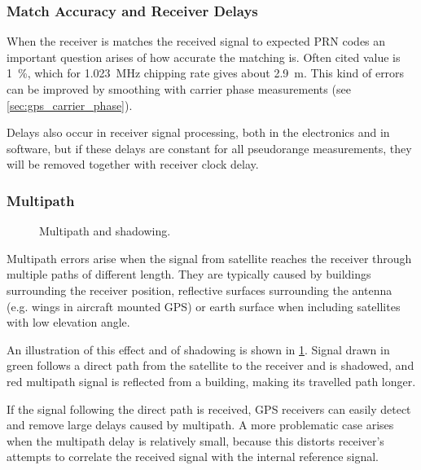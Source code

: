 
\subsubsection{Match Accuracy and Receiver Delays}

When the receiver is matches the received signal to expected PRN codes an 
important question arises of how accurate the matching is.
Often cited value is \SI{1}{\percent}, which for \SI{1.023}{\mega\hertz}
chipping rate gives about \SI{2.9}{\meter}.
This kind of errors can be improved by smoothing with carrier phase measurements (see
\cref{sec:gps_carrier_phase}).

Delays also occur in receiver signal processing, both in the electronics and in software,
but if these delays are constant for all pseudorange measurements, they will be removed
together with receiver clock delay.

\subsubsection{Multipath}

\begin{figure}[t]
	\centering
	
	\caption{Multipath and shadowing.}
	\label{fig:multipath}
\end{figure}

Multipath errors arise when the signal from satellite reaches the receiver
through multiple paths of different length.
They are typically caused by buildings surrounding the receiver position,
reflective surfaces surrounding the antenna (e.g. wings in aircraft mounted GPS) or earth surface
when including satellites with low elevation angle.

An illustration of this effect and of shadowing is shown in \cref{fig:multipath}.
Signal drawn in green follows a direct path from the satellite to the receiver and is shadowed,
and red multipath signal is reflected from a building, making its travelled path longer.

If the signal following the direct path is received, GPS receivers can easily detect and remove large delays caused by multipath.
A more problematic case arises when the multipath delay is relatively small, because this distorts
receiver's attempts to correlate the received signal with the internal reference signal.

